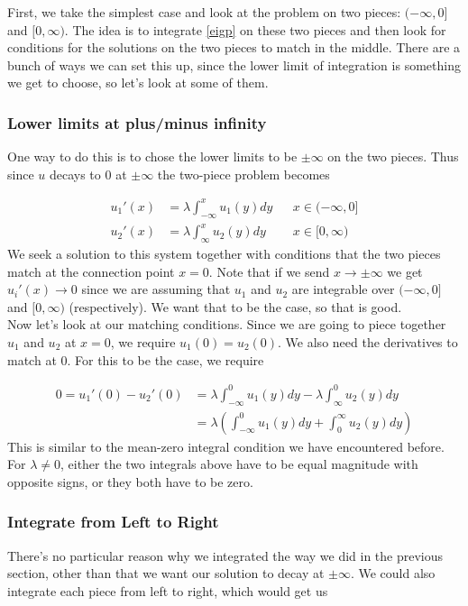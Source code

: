 \documentclass[12pt]{article}
\begin{document}
First, we take the simplest case and look at the problem on two pieces: $(-\infty, 0]$ and $[0,\infty)$. The idea is to integrate \eqref{eigp} on these two pieces and then look for conditions for the solutions on the two pieces to match in the middle. There are a bunch of ways we can set this up, since the lower limit of integration is something we get to choose, so let's look at some of them.

\subsubsection*{Lower limits at plus/minus infinity}
One way to do this is to chose the lower limits to be $\pm \infty$ on the two pieces. Thus since $u$ decays to 0 at $\pm \infty$ the two-piece problem becomes

\begin{align}
u_1'(x) &= \lambda \int_{-\infty}^x u_1(y) dy && x \in (-\infty, 0] \\
u_2'(x) &= \lambda \int_{\infty}^x u_2(y) dy && x \in [0, \infty)
\end{align}
We seek a solution to this system together with conditions that the two pieces match at the connection point $x = 0$. Note that if we send $x \rightarrow \pm \infty$ we get $u_i'(x) \rightarrow 0$ since we are assuming that $u_1$ and $u_2$ are integrable over $(-\infty, 0]$ and $[0, \infty)$ (respectively). We want that to be the case, so that is good. \\

Now let's look at our matching conditions. Since we are going to piece together $u_1$ and $u_2$ at $x = 0$, we require $u_1(0) = u_2(0)$. We also need the derivatives to match at 0. For this to be the case, we require

\begin{align*}
0 = u_1'(0) - u_2'(0) &= \lambda \int_{-\infty}^0 u_1(y) dy - \lambda \int_{\infty}^0 u_2(y) dy \\
&= \lambda \left( \int_{-\infty}^0 u_1(y) dy + \int_0^{\infty} u_2(y)dy \right)
\end{align*}
This is similar to the mean-zero integral condition we have encountered before. For $\lambda \neq 0$, either the two integrals above have to be equal magnitude with opposite signs, or they both have to be zero.\\

\subsubsection*{Integrate from Left to Right}
There's no particular reason why we integrated the way we did in the previous section, other than that we want our solution to decay at $\pm \infty$. We could also integrate each piece from left to right, which would get us
\end{document}
